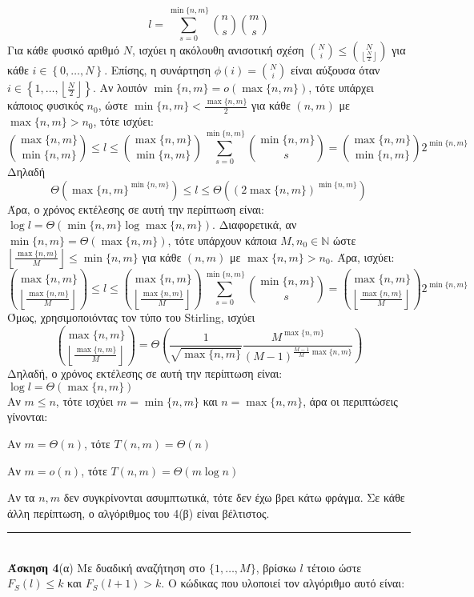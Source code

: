 \documentclass[12pt]{article}
\newcommand\en[1]{\latintext #1\greektext}
\newenvironment{b_item}{
\begin{itemize}
  \setlength{\itemsep}{0pt}
  \setlength{\parskip}{0pt}
  \setlength{\parsep}{0pt}
}{\end{itemize}}
\newcommand{\HRule}{\rule{\linewidth}{0.1mm}}
\begin{document}
$$l=\sum_{s=0}^{\min\{n,m\}}\binom{n}{s}\binom{m}{s}$$
Για κάθε φυσικό αριθμό $N$, ισχύει η ακόλουθη ανισοτική σχέση $\binom{N}{i}\leq\binom{N}{\left\lfloor\frac{N}{2}\right\rfloor}$ για κάθε $i\in\left\{0,\ldots,N\right\}$. Επίσης, η συνάρτηση $\phi\left(i\right)=\binom{N}{i}$ είναι αύξουσα όταν $i\in\left\{1,\ldots,\left\lfloor\frac{N}{2}\right\rfloor\right\}$. Αν λοιπόν $\min\{n,m\}=o\left(\max\{n,m\}\right)$, τότε υπάρχει κάποιος φυσικός $n_0$, ώστε $\min\{n,m\}<\frac{\max\{n,m\}}{2}$ για κάθε $(n,m)$ με $\max\{n,m\}>n_0$, τότε ισχύει:
$$\binom{\max\{n,m\}}{\min\{n,m\}}\leq l\leq\binom{\max\{n,m\}}{\min\{n,m\}}\sum_{s=0}^{\min\{n,m\}}\binom{\min\{n,m\}}{s}=\binom{\max\{n,m\}}{\min\{n,m\}}2^{\min\{n,m\}}$$
Δηλαδή
$$\Theta\left(\max\{n,m\}^{\min\{n,m\}}\right)\leq l\leq\Theta\left(\left(2\max\{n,m\}\right)^{\min\{n,m\}}\right)$$
Άρα, ο χρόνος εκτέλεσης σε αυτή την περίπτωση είναι: $\log l=\Theta\left(\min\{n,m\}\log\max\{n,m\}\right)$.
Διαφορετικά, αν $\min\{n,m\}=\Theta\left(\max\{n,m\}\right)$, τότε υπάρχουν κάποια $M,n_0\in\mathbb{N}$ ώστε $\left\lfloor\frac{\max\{n,m\}}{M}\right\rfloor\leq\min\{n,m\}$ για κάθε $(n,m)$ με $\max\{n,m\}>n_0$. Άρα, ισχύει:
$$\binom{\max\{n,m\}}{\left\lfloor\frac{\max\{n,m\}}{M}\right\rfloor}\leq l\leq\binom{\max\{n,m\}}{\left\lfloor\frac{\max\{n,m\}}{M}\right\rfloor}\sum_{s=0}^{\min\{n,m\}}\binom{\min\{n,m\}}{s}=\binom{\max\{n,m\}}{\left\lfloor\frac{\max\{n,m\}}{M}\right\rfloor}2^{\min\{n,m\}}$$
Όμως, χρησιμοποιόντας τον τύπο του \en{Stirling}, ισχύει
$$\binom{\max\{n,m\}}{\left\lfloor\frac{\max\{n,m\}}{M}\right\rfloor}=\Theta\left(\frac{1}{\sqrt{\max\{n,m\}}}\frac{M^{\max\{n,m\}}}{\left(M-1\right)^{\frac{M-1}{M}\max\{n,m\}}}\right)$$
Δηλαδή, ο χρόνος εκτέλεσης σε αυτή την περίπτωση είναι: $\log l=\Theta\left(\max\{n,m\}\right)$\\
Αν $m\leq n$, τότε ισχύει $m=\min\{n,m\}$ και $n=\max\{n,m\}$, άρα οι περιπτώσεις γίνονται:
\begin{b_item}
\item Αν $m=\Theta\left(n\right)$, τότε $T\left(n,m\right)=\Theta\left(n\right)$
\item Αν $m=o\left(n\right)$, τότε $T\left(n,m\right)=\Theta\left(m\log n\right)$
\end{b_item}
Αν τα $n,m$ δεν συγκρίνονται ασυμπτωτικά, τότε δεν έχω βρει κάτω φράγμα. Σε κάθε άλλη περίπτωση, ο αλγόριθμος του 4(β) είναι βέλτιστος.\\
\HRule\\
{\bf Άσκηση 4}(α) Με δυαδική αναζήτηση στο $\{1,\ldots,M\}$, βρίσκω $l$ τέτοιο ώστε $F_S\left(l\right)\leq k$ και $F_S\left(l+1\right)>k$. Ο κώδικας που υλοποιεί τον αλγόριθμο αυτό είναι:
\end{document}
